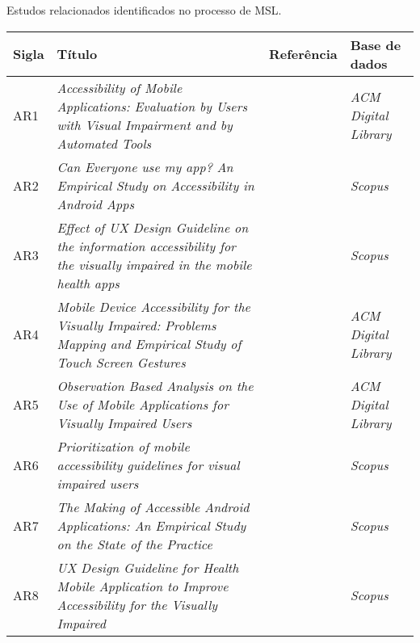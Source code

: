\begin{quadro}[htb!]
  \caption{\label{qua-art-rev-sis}Estudos relacionados identificados no processo de MSL.}
  \begin{tabular}{|m{0.8cm} | m{8.2cm} | m{2.7cm} | m{2.5cm}|}
    \hline
    \textbf{Sigla} & \textbf{Título}                                                                                                             & \textbf{Referência}      & \textbf{Base de dados}     \\
    \hline
    AR1             & \emph{Accessibility of Mobile Applications: Evaluation by Users with Visual Impairment and by Automated Tools}              & \cite{Mateus2020}        & \emph{ACM Digital Library} \\
    \hline
    AR2             & \emph{Can Everyone use my app? An Empirical Study on Accessibility in Android Apps}                                         & \cite{Vendome201941}     & \emph{Scopus}              \\
    \hline
    AR3             & \emph{Effect of UX Design Guideline on the information accessibility for the visually impaired in the mobile health apps}   & \cite{Kim20191103}       & \emph{Scopus}              \\
    \hline
    AR4             & \emph{Mobile Device Accessibility for the Visually Impaired: Problems Mapping and Empirical Study of Touch Screen Gestures} & \cite{Damaceno2016}      & \emph{ACM Digital Library} \\
    \hline
    AR5             & \emph{Observation Based Analysis on the Use of Mobile Applications for Visually Impaired Users}                             & \cite{Siebra2016}        & \emph{ACM Digital Library} \\
    \hline
    AR6             & \emph{Prioritization of mobile accessibility guidelines for visual impaired users}                                          & \cite{Quispe2020563}     & \emph{Scopus}              \\
    \hline
    AR7             & \emph{The Making of Accessible Android Applications: An Empirical Study on the State of the Practice}                       & \cite{DiGregorio2020857} & \emph{Scopus}              \\
    \hline
    AR8             & \emph{UX Design Guideline for Health Mobile Application to Improve Accessibility for the Visually Impaired}                 & \cite{Kim2016}           & \emph{Scopus}              \\
    \hline
  \end{tabular}
\end{quadro}

